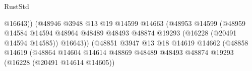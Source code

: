 \begin{lexlean}{RustStd}
\begin{coremodule}
                                                                @16643))
                                                            (@48946
                                                              @3948
                                                              @13
                                                              @19
                                                              @14599
                                                              @14663
                                                              (@48953
                                                                @14599
                                                                (@48959
                                                                  @14584
                                                                  @14594
                                                                  @48964
                                                                  @48489
                                                                  @48493
                                                                  @48874
                                                                  @19293
                                                                  (@16228 (@20491 @14594 @14585))
                                                                  @16643))
                                                              (@48851
                                                                @3947
                                                                @13
                                                                @18
                                                                @14619
                                                                @14662
                                                                (@48858
                                                                  @14619
                                                                  (@48864
                                                                    @14604
                                                                    @14614
                                                                    @48869
                                                                    @48489
                                                                    @48493
                                                                    @48874
                                                                    @19293
                                                                    (@16228 (@20491 @14614 @14605))

\end{coremodule}
\end{lexlean}
